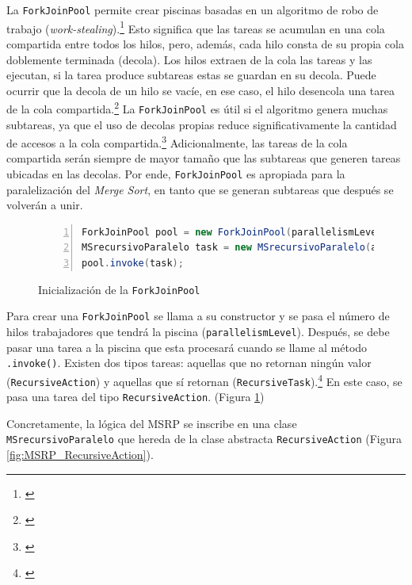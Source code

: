 \documentclass[titlepage]{article}
\begin{document}
La \lstinline|ForkJoinPool| permite crear piscinas basadas en un algoritmo de robo de trabajo (\textit{work-stealing}).\footnote{\cite{Ramgir2017-mv}} Esto significa que las tareas se acumulan en una cola compartida entre todos los hilos, pero, además, cada hilo consta de su propia cola doblemente terminada (decola). Los hilos extraen de la cola las tareas y las ejecutan, si la tarea produce subtareas estas se guardan en su decola. Puede ocurrir que la decola de un hilo se vacíe, en ese caso, el hilo desencola una tarea de la cola compartida.\footnote{\cite{kumar_2024}} La \lstinline|ForkJoinPool| es útil si el algoritmo genera muchas subtareas, ya que el uso de decolas propias reduce significativamente la cantidad de accesos a la cola compartida.\footnote{\cite{blumofe1999scheduling}} Adicionalmente, las tareas de la cola compartida serán siempre de mayor tamaño que las subtareas que generen tareas ubicadas en las decolas. Por ende, \lstinline|ForkJoinPool| es apropiada para la paralelización del \textit{Merge Sort}, en tanto que se generan subtareas que después se volverán a unir.

\begin{figure}[h]
	\begin{lstlisting}[language=java, frame=single, numbers=left]
ForkJoinPool pool = new ForkJoinPool(parallelismLevel);
MSrecursivoParalelo task = new MSrecursivoParalelo(arr, aux, left, right);
pool.invoke(task);
	\end{lstlisting}
	\caption{Inicialización de la \lstinline{ForkJoinPool}}
	\label{fig:creacionForkJoinPool}
\end{figure}

Para crear una \lstinline|ForkJoinPool| se llama a su constructor y se pasa el número de hilos trabajadores que tendrá la piscina (\lstinline|parallelismLevel|). Después, se debe pasar una tarea a la piscina que esta procesará cuando se llame al método \lstinline|.invoke()|. Existen dos tipos tareas: aquellas que no retornan ningún valor (\lstinline|RecursiveAction|) y aquellas que sí retornan (\lstinline|RecursiveTask|).\footnote{\cite{jenkov2024forkjoinpool}} En este caso, se pasa una tarea del tipo \lstinline|RecursiveAction|. (Figura \ref{fig:creacionForkJoinPool})

Concretamente, la lógica del MSRP se inscribe en una clase \lstinline|MSrecursivoParalelo| que hereda de la clase abstracta \lstinline|RecursiveAction| (Figura \ref{fig:MSRP_RecursiveAction}). 
\end{document}
